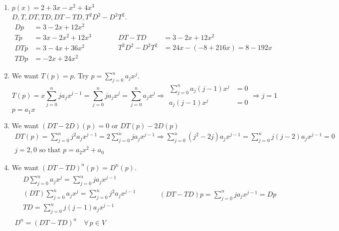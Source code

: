 \documentclass[twoside]{amsart}
\theoremstyle{plain}
\theoremstyle{definition}
\begin{document}
\begin{enumerate}
  \item $p(x) = 2 + 3x - x^2 + 4x^3$ \\
    $D,T, DT, TD, DT-TD, T^2 D^2 - D^2 T^2$.  
\[
\begin{aligned}
  Dp & = 3 - 2x + 12x^2 \\
  Tp & = 3x - 2x^2 + 12 x^3 \\
  DTp & = 3 - 4x + 36 x^2 \\
  TDp & = -2x + 24x^2 
\end{aligned} \quad \quad \quad 
\begin{aligned}
  DT - TD & = 3 - 2x + 12x^2 \\ 
  T^2 D^2 - D^2 T^2 & = 24x - (-8 + 216x ) = 8 - 192x 
\end{aligned}
\]
  \item We want $T(p) = p$.  Try $p = \sum_{j=0}^n a_j x^j$.  
\[
T(p) = x \sum_{j=0}^n j a_j x^{j-1} = \sum_{j=0}^n ja_j x^j = \sum_{j=0}^n a_j x^j \Longrightarrow \begin{aligned}
\sum_{j=0}^n a_j (j-1)x^j & = 0 \\
a_j(j-1) x^j & = 0 
\end{aligned} \Longrightarrow j = 1 
\]
$p=a_1 x$
  \item We want $(DT - 2D)(p) = 0$ or $DT(p) - 2D(p)$ 
\[
\begin{gathered}
DT(p) = \sum_{j=0}^n j^2 a_j x^{j-1} = 2\sum_{j=0}^n j a_j x^{j-1} \Longrightarrow \sum_{j=0}^n (j^2 - 2j)a_j x^{j-1} = \sum_{j=0}^n j (j-2) a_j x^{j-1} = 0  \\
j=2,0 \text{ so that } p = a_2 x^2 + a_0 
\end{gathered}
\]
\item We want $(DT - TD)^n(p) = D^n(p)$.  
\[
\begin{gathered}
\begin{aligned}
  & D\sum_{j=0}^n a_j x^j = \sum_{j=0}^n j a_j x^{j-1} \\
  & (DT) \sum_{j=0}^n a_j x^j = \sum_{j=0}^n j^2 a_j x^{j-1} \\
  & TD = \sum_{j=0}^n j(j-1) a_j x^{j-1}
\end{aligned} \quad \quad \quad (DT -TD)p = \sum_{j=0}^n j a_j x^{j-1} = Dp  \\
 D^n  = (DT- TD)^n \quad \forall \, p \in V
\end{gathered}
\]
\end{enumerate}
\end{document}
